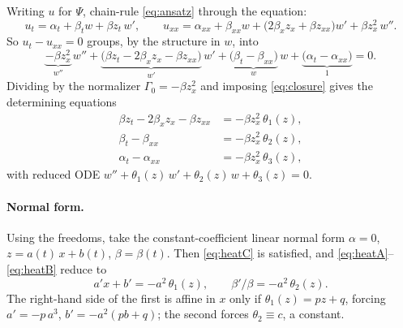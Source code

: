 \documentclass[11pt]{article}
\begin{document}
Writing $u$ for $\Psi$, chain-rule \eqref{eq:ansatz} through the equation:
\[
  u_t=\alpha_t+\beta_t w+\beta z_t\,w',\qquad
  u_{xx}=\alpha_{xx}+\beta_{xx}w+\bigl(2\beta_x z_x+\beta z_{xx}\bigr)w'
         +\beta z_x^{2}\,w''.
\]
So $u_t-u_{xx}=0$ groups, by the structure in $w$, into
\begin{equation}
  \underbrace{-\beta z_x^{2}}_{w''}\,w''
  +\underbrace{\bigl(\beta z_t-2\beta_x z_x-\beta z_{xx}\bigr)}_{w'}\,w'
  +\underbrace{\bigl(\beta_t-\beta_{xx}\bigr)}_{w}\,w
  +\underbrace{\bigl(\alpha_t-\alpha_{xx}\bigr)}_{1}=0.
  \label{eq:heat-grouped}
\end{equation}
Dividing by the normalizer $\Gamma_0=-\beta z_x^2$ and imposing
\eqref{eq:closure} gives the determining equations
\begin{align}
  \beta z_t-2\beta_x z_x-\beta z_{xx} &= -\beta z_x^2\,\theta_1(z),
  \label{eq:heatA}\\
  \beta_t-\beta_{xx} &= -\beta z_x^2\,\theta_2(z),
  \label{eq:heatB}\\
  \alpha_t-\alpha_{xx} &= -\beta z_x^2\,\theta_3(z),
  \label{eq:heatC}
\end{align}
with reduced ODE $w''+\theta_1(z)\,w'+\theta_2(z)\,w+\theta_3(z)=0$.

\paragraph{Normal form.} Using the freedoms, take the constant-coefficient
linear normal form $\alpha=0$, $z=a(t)\,x+b(t)$, $\beta=\beta(t)$. Then
\eqref{eq:heatC} is satisfied, and \eqref{eq:heatA}--\eqref{eq:heatB} reduce to
\[
  a'x+b'=-a^2\,\theta_1(z),\qquad \beta'/\beta=-a^2\,\theta_2(z).
\]
The right-hand side of the first is affine in $x$ only if $\theta_1(z)=pz+q$,
forcing $a'=-p\,a^3$, $b'=-a^2(pb+q)$; the second forces $\theta_2\equiv c$,
a constant.
\end{document}
